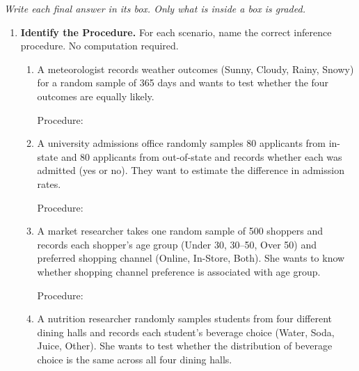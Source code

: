 \documentclass[10pt]{article}
\begin{document}
{\small\itshape Write each final answer in its box. Only what is inside a box is graded.}\par

\vspace{0.10in}

\begin{enumerate}

\item \textbf{Identify the Procedure.} \; For each scenario, name the correct inference
      procedure. No computation required.

\begin{enumerate}[label=\alph*.]
  \item A meteorologist records weather outcomes (Sunny, Cloudy, Rainy, Snowy) for a random
        sample of 365 days and wants to test whether the four outcomes are equally likely.

        Procedure: \gradedblank[id=hw1a, type=short, points=1, answer={chi-square goodness-of-fit test}, check=text, display={\bfseries $\chi^2$ goodness-of-fit test}]{3.5in}{0.3in}

  \item A university admissions office randomly samples 80 applicants from in-state and 80
        applicants from out-of-state and records whether each was admitted (yes or no). They
        want to estimate the difference in admission rates.

        Procedure: \gradedblank[id=hw1b, type=short, points=1, answer={two-sample z-interval for p1 - p2}, check=text, display={\bfseries Two-sample $z$-interval for $p_1 - p_2$}]{3.5in}{0.3in}

  \item A market researcher takes one random sample of 500 shoppers and records each shopper's
        age group (Under 30, 30--50, Over 50) and preferred shopping channel (Online, In-Store,
        Both). She wants to know whether shopping channel preference is associated with age group.

        Procedure: \gradedblank[id=hw1c, type=short, points=1, answer={chi-square test for independence}, check=text, display={\bfseries $\chi^2$ test for independence}]{3.5in}{0.3in}

  \item A nutrition researcher randomly samples students from four different dining halls and
        records each student's beverage choice (Water, Soda, Juice, Other). She wants to test
        whether the distribution of beverage choice is the same across all four dining halls.


\end{enumerate}
\end{enumerate}
\end{document}
